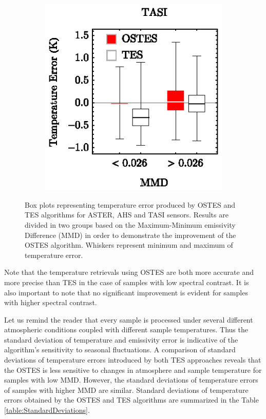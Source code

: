 \begin{figure}[!b]
\begin{subfigure}[t]{.3\linewidth}
		\centering
		\includegraphics[scale=1]{pics/Chapter_04/Simulated_data_TASI.eps}
		\hspace{1cm}\caption{}
	\end{subfigure}
	\vspace{1.5 em}
	\caption{Box plots representing temperature error produced by OSTES and TES algorithms for ASTER, AHS and TASI sensors. Results are divided in two groups based on the Maximum-Minimum emissivity Difference (MMD) in order to demonstrate the improvement of the OSTES algorithm. Whiskers represent minimum and maximum of temperature error.}
	\label{fig:SimualtedDataTemperatureErrorVsLowVsHighMMD}
\end{figure}

Note that the temperature retrievals using OSTES are both more accurate and more precise than TES in the case of samples with low spectral contrast. It is also important to note that no significant improvement is evident for samples with higher spectral contrast. 

Let us remind the reader that every sample is processed under several different atmospheric conditions coupled with different sample temperatures. Thus the standard deviation of temperature and emissivity error is indicative of the algorithm's sensitivity to seasonal fluctuations. A comparison of standard deviations of temperature errors introduced by both TES approaches reveals that the OSTES is less sensitive to changes in atmosphere and sample temperature for samples with low MMD. However, the standard deviations of temperature errors of samples with higher MMD are similar. Standard deviations of temperature errors obtained by the OSTES and TES algorithms are summarized in the Table \ref{table:StandardDeviations}.

